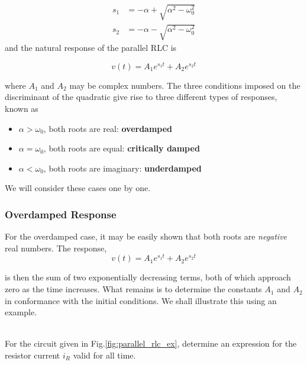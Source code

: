 \documentclass[11pt]{article}
\numberwithin{equation}{section}
\begin{document}
\begin{flushleft}
\begin{align}
s_1 &= -\alpha + \sqrt{\alpha^2 - \omega_0^2}\\
s_2 &= -\alpha - \sqrt{\alpha^2 - \omega_0^2}
\end{align}
and the natural response of the parallel RLC is

\begin{equation}
v(t) = A_1e^{s_1t} + A_2e^{s_2t}
\end{equation}

where $A_1$ and $A_2$ may be complex numbers.
The three conditions imposed on the discriminant of the quadratic give rise to three different types of responses, known as

\begin{itemize}
\item $\alpha > \omega_0$, both roots are real: \textbf{overdamped}
\item $\alpha = \omega_0$, both roots are equal: \textbf{critically damped}
\item $\alpha < \omega_0$, both roots are imaginary: \textbf{underdamped}
\end{itemize}

We will consider these cases one by one.

\color{blue}
\subsubsection{Overdamped Response}
\color{black}

For the overdamped case, it may be easily shown that both roots are \textit{negative} real numbers. The response,
\begin{equation*}
v(t) = A_1e^{s_1t} + A_2e^{s_2t}
\end{equation*}

is then the sum of two exponentially decreasing terms, both of which approach zero as the time increases. What remains is to determine the constants
$A_1$ and $A_2$ in conformance with the initial conditions. We shall illustrate this using an example. \\~\\

\begin{tcolorbox}[colback=Magenta!5, colframe=Magenta!75!black, title=\textbf{Example 3.1}, breakable]

For the circuit given in Fig.\ref{fig:parallel_rlc_ex}, determine an expression for the resistor current $i_R$ valid for all time.


\end{tcolorbox}
\end{flushleft}
\end{document}
